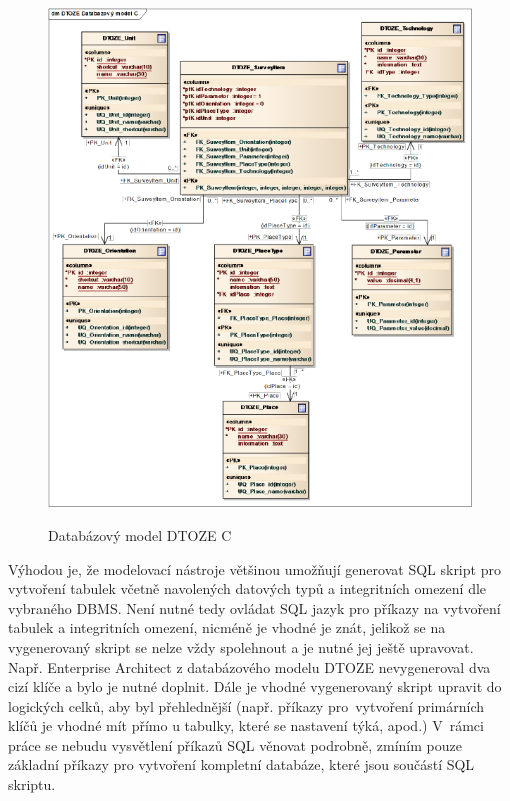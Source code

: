 \documentclass[11pt,a4paper]{article}
\begin{document}
\begin{figure}[H] 
\centering 
\caption{Databázový model DTOZE C} 
\vspace{0.1cm}
\includegraphics[scale=0.75]{DTOZE_fyzC_n} 
\label{fig:DTOZE_fyz_C}
\end{figure} 
\vspace{0.3cm}

Výhodou je, že modelovací nástroje většinou umožňují generovat SQL skript pro vytvoření tabulek včetně navolených datových typů a integritních omezení dle vybraného DBMS. Není nutné tedy ovládat SQL jazyk pro příkazy na vytvoření tabulek a integritních omezení, nicméně je vhodné je znát, jelikož se na vygenerovaný skript se nelze vždy spolehnout a je nutné jej ještě upravovat. Např. Enterprise Architect z databázového modelu DTOZE nevygeneroval dva cizí klíče a bylo je nutné doplnit. Dále je vhodné vygenerovaný skript upravit do logických celků, aby byl přehlednější (např. příkazy pro~vytvoření primárních klíčů je vhodné mít přímo u tabulky, které se nastavení týká, apod.) V~rámci práce se nebudu vysvětlení příkazů SQL věnovat podrobně, zmíním pouze základní příkazy pro vytvoření kompletní databáze, které jsou součástí SQL skriptu. 
\end{document}
